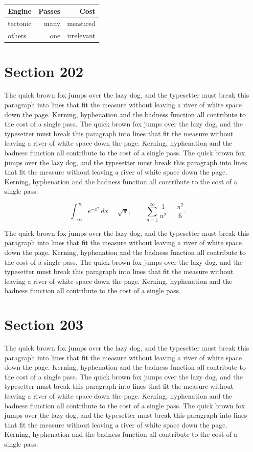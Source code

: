 \documentclass{article}
\begin{document}
\begin{center}
\begin{tabular}{lrr}
\toprule
Engine & Passes & Cost \\
\midrule
tectonic & many & measured \\
others & one & irrelevant \\
\bottomrule
\end{tabular}
\end{center}

\section{Section 202}
The quick brown fox jumps over the lazy dog, and the typesetter must break this paragraph into lines that fit the measure without leaving a river of white space down the page. Kerning, hyphenation and the badness function all contribute to the cost of a single pass. The quick brown fox jumps over the lazy dog, and the typesetter must break this paragraph into lines that fit the measure without leaving a river of white space down the page. Kerning, hyphenation and the badness function all contribute to the cost of a single pass. The quick brown fox jumps over the lazy dog, and the typesetter must break this paragraph into lines that fit the measure without leaving a river of white space down the page. Kerning, hyphenation and the badness function all contribute to the cost of a single pass. 

\begin{equation}
\int_{-\infty}^{\infty} e^{-x^{2}}\,dx = \sqrt{\pi}, \qquad
\sum_{n=1}^{\infty} \frac{1}{n^{2}} = \frac{\pi^{2}}{6}.
\end{equation}

The quick brown fox jumps over the lazy dog, and the typesetter must break this paragraph into lines that fit the measure without leaving a river of white space down the page. Kerning, hyphenation and the badness function all contribute to the cost of a single pass. The quick brown fox jumps over the lazy dog, and the typesetter must break this paragraph into lines that fit the measure without leaving a river of white space down the page. Kerning, hyphenation and the badness function all contribute to the cost of a single pass. 
\section{Section 203}
The quick brown fox jumps over the lazy dog, and the typesetter must break this paragraph into lines that fit the measure without leaving a river of white space down the page. Kerning, hyphenation and the badness function all contribute to the cost of a single pass. The quick brown fox jumps over the lazy dog, and the typesetter must break this paragraph into lines that fit the measure without leaving a river of white space down the page. Kerning, hyphenation and the badness function all contribute to the cost of a single pass. The quick brown fox jumps over the lazy dog, and the typesetter must break this paragraph into lines that fit the measure without leaving a river of white space down the page. Kerning, hyphenation and the badness function all contribute to the cost of a single pass. 
\end{document}
